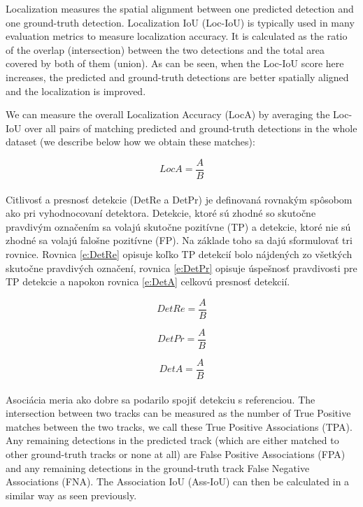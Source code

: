 Localization measures the spatial alignment between one predicted detection and one ground-truth detection. Localization IoU (Loc-IoU) is typically used in many evaluation metrics to measure localization accuracy. It is calculated as the ratio of the overlap (intersection) between the two detections and the total area covered by both of them (union). As can be seen, when the Loc-IoU score here increases, the predicted and ground-truth detections are better spatially aligned and the localization is improved.

We can measure the overall Localization Accuracy (LocA) by averaging the Loc-IoU over all pairs of matching predicted and ground-truth detections in the whole dataset (we describe below how we obtain these matches):

\begingroup
\large
\begin{equation}
LocA = \frac{A}{B}
\label{e:DetRe}
\end{equation}
\endgroup
\\
Citlivosť a presnosť detekcie (DetRe a DetPr) je definovaná rovnakým spôsobom ako pri vyhodnocovaní detektora. Detekcie, ktoré sú zhodné so skutočne pravdivým označením sa volajú skutočne pozitívne (TP) a detekcie, ktoré nie sú zhodné sa volajú falošne pozitívne (FP). Na základe toho sa dajú sformulovať tri rovnice. 
Rovnica \ref{e:DetRe} opisuje koľko TP detekcií bolo nájdených zo všetkých skutočne pravdivých označení, rovnica \ref{e:DetPr} opisuje úspešnosť pravdivosti pre TP detekcie a napokon rovnica \ref{e:DetA} celkovú presnosť detekcií.

\begingroup
\large
\begin{equation}
DetRe = \frac{A}{B}
\label{e:DetRe}
\end{equation}

\begin{equation}
DetPr = \frac{A}{B}
\label{e:DetPr}
\end{equation}

\begin{equation}
DetA = \frac{A}{B}
\label{e:DetA}
\end{equation}
\endgroup
\\
Asociácia meria ako dobre sa podarilo spojiť detekciu s referenciou.  The intersection between two tracks can be measured as the number of True Positive matches between the two tracks, we call these True Positive Associations (TPA). Any remaining detections in the predicted track (which are either matched to other ground-truth tracks or none at all) are False Positive Associations (FPA) and any remaining detections in the ground-truth track False Negative Associations (FNA). The Association IoU (Ass-IoU) can then be calculated in a similar way as seen previously.

